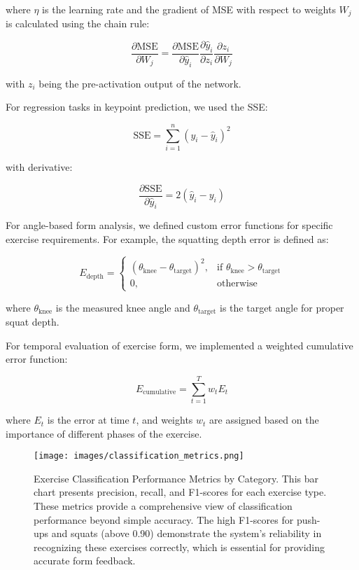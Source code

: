 \documentclass[11pt]{article}
\begin{document}
where $\eta$ is the learning rate and the gradient of MSE with respect to weights $W_j$ is calculated using the chain rule:

\begin{equation}
\frac{\partial \text{MSE}}{\partial W_j} = \frac{\partial \text{MSE}}{\partial \hat{y}_i} \frac{\partial \hat{y}_i}{\partial z_i} \frac{\partial z_i}{\partial W_j}
\end{equation}

with $z_i$ being the pre-activation output of the network.

For regression tasks in keypoint prediction, we used the SSE:

\begin{equation}
\text{SSE} = \sum_{i=1}^{n} (y_i - \hat{y}_i)^2
\end{equation}

with derivative:

\begin{equation}
\frac{\partial \text{SSE}}{\partial \hat{y}_i} = 2(\hat{y}_i - y_i)
\end{equation}

For angle-based form analysis, we defined custom error functions for specific exercise requirements. For example, the squatting depth error is defined as:

\begin{equation}
E_{\text{depth}} = 
\begin{cases}
(\theta_{\text{knee}} - \theta_{\text{target}})^2, & \text{if } \theta_{\text{knee}} > \theta_{\text{target}} \\
0, & \text{otherwise}
\end{cases}
\end{equation}

where $\theta_{\text{knee}}$ is the measured knee angle and $\theta_{\text{target}}$ is the target angle for proper squat depth.

For temporal evaluation of exercise form, we implemented a weighted cumulative error function:

\begin{equation}
E_{\text{cumulative}} = \sum_{t=1}^{T} w_t E_t
\end{equation}

where $E_t$ is the error at time $t$, and weights $w_t$ are assigned based on the importance of different phases of the exercise.

\begin{figure}[htbp]
    \centering
    \texttt{[image: images/classification\_metrics.png]}
    \caption{Exercise Classification Performance Metrics by Category. This bar chart presents precision, recall, and F1-scores for each exercise type. These metrics provide a comprehensive view of classification performance beyond simple accuracy. The high F1-scores for push-ups and squats (above 0.90) demonstrate the system's reliability in recognizing these exercises correctly, which is essential for providing accurate form feedback.}
    \label{fig:classification_metrics}
\end{figure}
\end{document}
